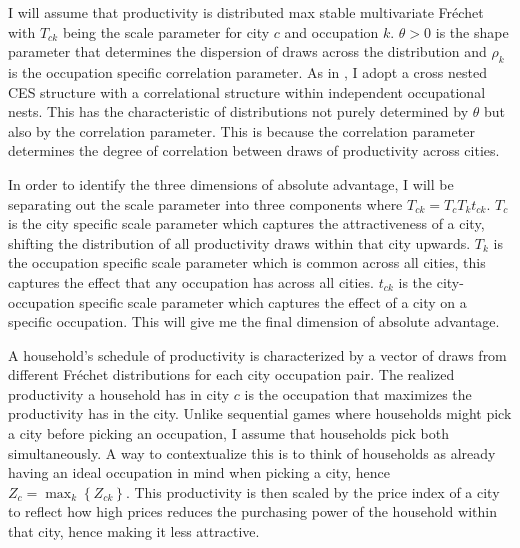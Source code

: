 \documentclass[10pt]{article}
\begin{document}
I will assume that productivity is distributed max stable multivariate Fr\'{e}chet with $T_{ck}$ being the scale parameter for city $c$ and occupation $k$. $\theta > 0$ is the shape parameter that determines the dispersion of draws across the distribution and $\rho_k$ is the occupation specific correlation parameter. As in \cite{lindandramondo}, I adopt a cross nested CES structure with a correlational structure within independent occupational nests. This has the characteristic of distributions not purely determined by $\theta$ but also by the correlation parameter. This is because the correlation parameter determines the degree of correlation between draws of productivity across cities.

In order to identify the three dimensions of absolute advantage, I will be separating out the scale parameter into three components where $T_{ck} = T_c T_k t_{ck}$. $T_c$ is the city specific scale parameter which captures the attractiveness of a city, shifting the distribution of all productivity draws within that city upwards. $T_k$ is the occupation specific scale parameter which is common across all cities, this captures the effect that any occupation has across all cities. $t_{ck}$ is the city-occupation specific scale parameter which captures the effect of a city on a specific occupation. This will give me the final dimension of absolute advantage.


A household's schedule of productivity is characterized by a vector of draws from different Fr\'{e}chet distributions for each city occupation pair. The realized productivity a household has in city $c$ is the occupation that maximizes the productivity has in the city. Unlike sequential games where households might pick a city before picking an occupation, I assume that households pick both simultaneously. A way to contextualize this is to think of households as already having an ideal occupation in mind when picking a city, hence $Z_c = \max_k \left\{ Z_{ck} \right\}$. This productivity is then scaled by the price index of a city to reflect how high prices reduces the purchasing power of the household within that city, hence making it less attractive.

\end{document}
